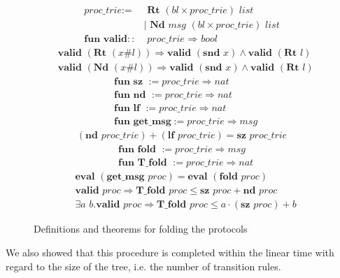 \documentclass[conference]{IEEEtran}
\begin{document}
\begin{figure}
\centering
\begin{align}
    \textit{proc\_trie} :=& \textbf{ Rt } (\textit{bl} \times \textit{proc\_trie}) \textit{ list} \nonumber \\
            &| \textbf{ Nd } \textit{msg } (\textit{bl} \times \textit{proc\_trie}) \textit{ list}\nonumber\\
    \textbf{fun valid} ::& \textit{ proc\_trie } \Rightarrow \textit{ bool} \nonumber
\end{align}
\begin{align}
    &\textbf{valid } (\textbf{Rt } (\textit{x\#l})) \Longrightarrow \textbf{valid } (\textbf{snd } \textit{x}) \land \textbf{valid } (\textbf{Rt } \textit{l}) \nonumber\\
    &\textbf{valid } (\textbf{Nd } (\textit{x\#l})) \Longrightarrow \textbf{valid } (\textbf{snd } \textit{x}) \land \textbf{valid } (\textbf{Rt } \textit{l}) \nonumber
\end{align}
\begin{align}
    &\textbf{fun } \textbf{sz } := \textit{proc\_trie} \Rightarrow \textit{nat} \nonumber\\
    &\textbf{fun } \textbf{nd } := \textit{proc\_trie} \Rightarrow \textit{nat} \nonumber\\
    &\textbf{fun } \textbf{lf } := \textit{proc\_trie} \Rightarrow \textit{nat} \nonumber\\
    &\textbf{fun } \textbf{get\_msg} := \textit{proc\_trie} \Rightarrow \textit{msg} \nonumber
\end{align}
\begin{align}
    (\textbf{nd } \textit{proc\_trie}) + (\textbf{lf } \textit{proc\_trie}) = \textbf{sz } \textit{proc\_trie}\nonumber
\end{align}
\begin{align}
    &\textbf{fun } \textbf{fold } := \textit{proc\_trie} \Rightarrow \textit{msg}\nonumber\\
    &\textbf{fun } \textbf{T\_fold } := \textit{proc\_trie} \Rightarrow \textit{nat}\nonumber
\end{align}
\begin{align}
    &\textbf{eval } (\textbf{get\_msg } \textit{proc}) = \textbf{eval } (\textbf{fold } \textit{proc}) \nonumber\\
    &\textbf{valid } \textit{proc} \Longrightarrow \textbf{T\_fold } \textit{proc} \leq \textbf{sz } \textit{proc} + \textbf{nd } \textit{proc} \nonumber\\
    &\exists \textit{a b}. \textbf{valid } \textit{proc} \Longrightarrow \textbf{T\_fold } \textit{proc} \leq a \cdot (\textbf{sz } proc) + b \nonumber\label{eq: 8}
\end{align}
\caption{Definitions and theorems for folding the protocols}
\label{figure:9}
\end{figure}
We also showed that this procedure is completed within the linear time with regard to the size of the tree, i.e. the number of transition rules. 
\end{document}

